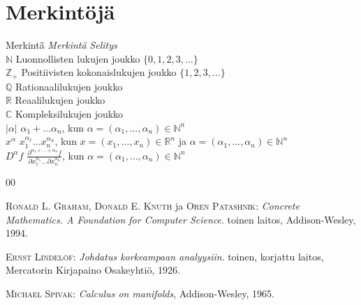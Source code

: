 \documentclass[a4paper,12 pt]{article}
\theoremstyle{plain}
\theoremstyle{definition}
\theoremstyle{remark}
\numberwithin{equation}{section}
\numberwithin{figure}{section}
\begin{document}
\newpage

\section{Merkint\"oj\"a}

\begin{tabbing}
Merkint\"a\qquad\=  \kill %
\textit{Merkint\"a} \> \textit{Selitys} \\
$\mathbb{N}$      \> Luonnollisten lukujen joukko $\{0, 1, 2, 3,\dots\}$ \\
$\mathbb{Z}_+$    \> Positiivisten kokonaislukujen joukko $\{1, 2, 3,\dots\}$ \\
$\mathbb{Q}$      \> Rationaalilukujen joukko \\
$\mathbb{R}$      \> Reaalilukujen joukko \\
$\mathbb{C}$      \> Kompleksilukujen joukko \\
$|\alpha|$        \> $\alpha_1+\dots \alpha_n$,
                     kun $\alpha=(\alpha_1,\dots,\alpha_n) \in\mathbb{N}^n$ \\
$x^\alpha$        \> $x_1^{\alpha_1}\dots x_n^{\alpha_n}$,
                     kun $x=(x_1,\dots,x_n) \in\mathbb{R}^n$
                     ja $\alpha=(\alpha_1,\dots,\alpha_n) \in\mathbb{N}^n$ \\
$D^\alpha f$      \> $\tfrac{\partial^{\alpha_1+\dots+\alpha_n} f}
                      {\partial x_1^{\alpha_1}\dots \partial x_n^{\alpha_n}}$,
                     kun $\alpha=(\alpha_1,\dots,\alpha_n) \in\mathbb{N}^n$
\end{tabbing}

\newpage
\begin{thebibliography}{00}  %

\textsc{Ronald L. Graham}, \textsc{Donald E. Knuth} ja \textsc{Oren Patashnik}:
\textit{Concrete Mathematics. A Foundation for Computer Science}.
toinen laitos, Addison-Wesley, 1994.


\textsc{Ernst Lindel\"of}:
\textit{Johdatus korkeampaan analyysiin}.
toinen, korjattu laitos, Mercatorin Kirjapaino Osakeyhti\"o, 1926.


\textsc{Michael Spivak}:
\textit{Calculus on manifolds},
Addison-Wesley, 1965.

\end{thebibliography}
\end{document}
